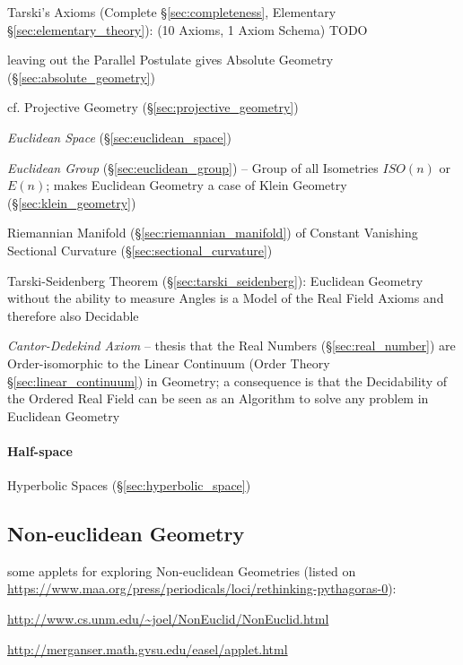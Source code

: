 Tarski's Axioms (Complete \S\ref{sec:completeness}, Elementary
\S\ref{sec:elementary_theory}): (10 Axioms, 1 Axiom Schema) TODO

\fist leaving out the Parallel Postulate gives Absolute Geometry
(\S\ref{sec:absolute_geometry})

cf. Projective Geometry (\S\ref{sec:projective_geometry})

\emph{Euclidean Space} (\S\ref{sec:euclidean_space})

\emph{Euclidean Group} (\S\ref{sec:euclidean_group}) -- Group of all
Isometries $ISO(n)$ or $E(n)$; makes Euclidean Geometry a case of
Klein Geometry (\S\ref{sec:klein_geometry})

Riemannian Manifold (\S\ref{sec:riemannian_manifold}) of Constant Vanishing
Sectional Curvature (\S\ref{sec:sectional_curvature})

Tarski-Seidenberg Theorem (\S\ref{sec:tarski_seidenberg}): Euclidean Geometry
without the ability to measure Angles is a Model of the Real Field Axioms
and therefore also Decidable

\emph{Cantor-Dedekind Axiom} -- thesis that the Real Numbers
(\S\ref{sec:real_number}) are Order-isomorphic to the Linear Continuum (Order
Theory \S\ref{sec:linear_continuum}) in Geometry; a consequence is that the
Decidability of the Ordered Real Field can be seen as an Algorithm to solve any
problem in Euclidean Geometry



\paragraph{Half-space}\label{sec:half_space}\hfill

Hyperbolic Spaces (\S\ref{sec:hyperbolic_space})



\subsection{Non-euclidean Geometry}\label{sec:noneuclidean_geometry}

some applets for exploring Non-euclidean Geometries (listed on
\url{https://www.maa.org/press/periodicals/loci/rethinking-pythagoras-0}):

\url{http://www.cs.unm.edu/~joel/NonEuclid/NonEuclid.html}

\url{http://merganser.math.gvsu.edu/easel/applet.html}

